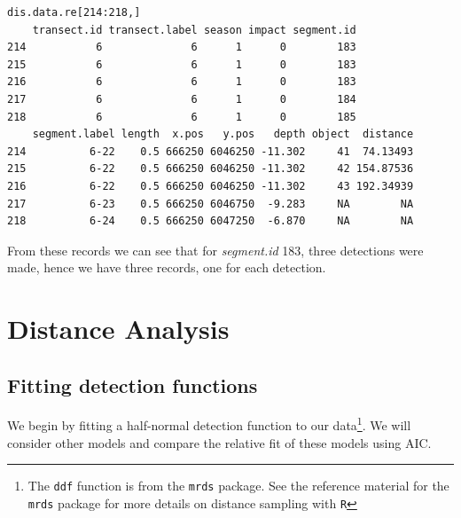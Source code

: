 \begin{knitrout}\footnotesize
{}\color{fgcolor}\begin{kframe}
\begin{verbatim}
dis.data.re[214:218,]
    transect.id transect.label season impact segment.id
214           6              6      1      0        183
215           6              6      1      0        183
216           6              6      1      0        183
217           6              6      1      0        184
218           6              6      1      0        185
    segment.label length  x.pos   y.pos   depth object  distance
214          6-22    0.5 666250 6046250 -11.302     41  74.13493
215          6-22    0.5 666250 6046250 -11.302     42 154.87536
216          6-22    0.5 666250 6046250 -11.302     43 192.34939
217          6-23    0.5 666250 6046750  -9.283     NA        NA
218          6-24    0.5 666250 6047250  -6.870     NA        NA
\end{verbatim}
\end{kframe}
\end{knitrout}
\noindent From these records we can see that for \textit{segment.id} 183, three detections were made, hence we have three records, one for each detection. \\



\section{Distance Analysis}
\label{sec:distsamp}
\subsection{Fitting detection functions}
\label{ss:fittingdetectionfunctions}
We begin by fitting a half-normal detection function to our data\footnote{The {\tt ddf} function is from the {\tt mrds} package. See the reference material for the {\tt mrds} package for more details on distance sampling with {\tt R}}. We will consider other models and compare the relative fit of these models using AIC.\\

